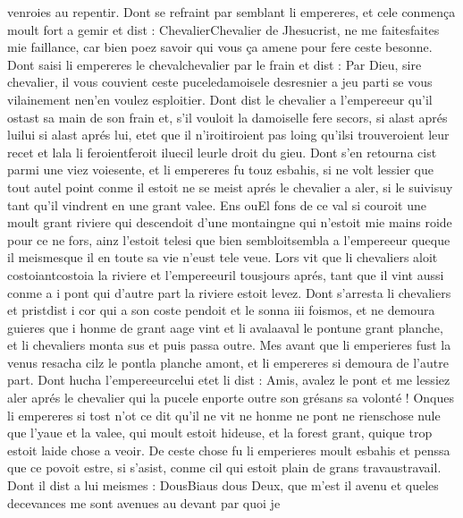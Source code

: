 \documentclass{article}
\begin{document}
\begin{pages}
      venroies au repentir.
   Dont se refraint par semblant li empereres, et cele conmença moult fort a gemir et dist :
   ChevalierChevalier de Jhesucrist, 
      ne me faitesfaites mie
      faillance, car bien poez savoir qui vous ça amene pour fere ceste besonne.
   Dont saisi li empereres le 
   chevalchevalier par le frain 
   et dist :
   Par Dieu, sire chevalier, il vous couvient 
      ceste puceledamoisele 
      desresnier a jeu parti se vous vilainement nen'en voulez esploitier.
   Dont dist le chevalier a l’empereeur 
   qu’il ostast sa main de son frain et, s’il vouloit 
      la damoiselle 
      fere secors, si alast aprés luilui si alast aprés lui, 
      etet que 
      il 
      n’iroitiroient pas loing 
      qu’ilsi trouveroient leur recet et 
      lala li 
      feroientferoit
      iluecil 
      leurle droit du gieu. 
   Dont s’en retourna cist parmi une viez voiesente, 
   et li empereres 
   fu touz esbahis, si ne volt lessier que tout autel point conme il estoit ne 
   se meist aprés le chevalier 
   a aler, 
   si le suivisuy tant qu’il vindrent en une grant valee. 
   Ens ouEl fons de ce val si couroit une moult grant riviere 
   qui descendoit d’une montaingne qui n’estoit mie mains roide pour ce ne fors, 
   ainz l'estoit telesi que bien 
   sembloitsembla a l’empereeur 
   queque il meismesque il en toute sa vie n’eust tele veue. 
   Lors vit que li chevaliers 
   aloit costoiantcostoia la riviere et 
   l’empereeuril tousjours aprés, 
   tant que il vint aussi conme a i pont qui d’autre part la riviere estoit levez. 
   Dont s’arresta li chevaliers et 
   pristdist i cor qui 
   a son coste pendoit et le sonna iii foismos, et ne demoura guieres que 
   i honme de grant aage vint et li avalaaval 
   le pontune grant planche, 
   et li chevaliers monta sus et puis passa outre. 
   Mes avant que li emperieres fust la venus resacha cilz 
   le pontla planche amont, 
   et li empereres si demoura de l’autre part. Dont hucha 
   l’empereeurcelui 
   etet li dist :
   Amis, avalez le pont et me lessiez aler aprés 
      le chevalier qui la pucele
      enporte outre son grésans sa volonté !
   Onques li empereres si tost n’ot ce dit qu’il ne vit ne honme ne pont 
   ne rienschose nule que l’yaue et la valee, qui moult estoit hideuse, 
   et la forest grant, quique trop estoit laide chose a veoir. \pend
\pstart De ceste chose fu li emperieres moult esbahis et penssa que 
   ce povoit estre, si s’asist, conme cil qui estoit plain de grans 
   travaustravail. 
   Dont il dist a lui meismes :
   DousBiaus dous Deux, 
      que m’est il avenu et queles decevances me sont avenues au devant par quoi je 

\end{pages}
\end{document}
